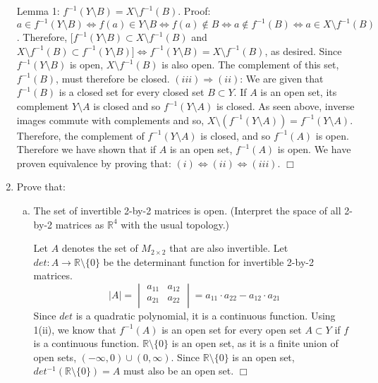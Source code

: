 \documentclass[12pt,letterpaper,reqno]{amsart}
\newcommand{\R}{\mathbb R}
\begin{document}
\begin{enumerate}[1.]
\begin{flushleft}
Lemma 1: $f^{-1}(Y \setminus B) = X \setminus f^{-1}(B)$. \newline Proof: $a \in f^{-1}(Y \setminus B) \Leftrightarrow f(a) \in Y \setminus B \Leftrightarrow f(a) \not\in B \Leftrightarrow a \not\in f^{-1}(B) \Leftrightarrow a \in X \setminus f^{-1}(B)$. Therefore, $[f^{-1}(Y \setminus B) \subset X \setminus f^{-1}(B)$ and $X \setminus f^{-1}(B) \subset f^{-1}(Y \setminus B)] \Leftrightarrow f^{-1}(Y \setminus B) = X \setminus f^{-1}(B)$, as desired. \newline
Since $f^{-1}(Y \setminus B)$ is open, $X \setminus f^{-1}(B)$ is also open. The complement of this set, $f^{-1}(B)$, must therefore be closed. \newline
$(iii) \Rightarrow (ii)$: We are given that $f^{-1}(B)$ is a closed set for every closed set $B\subset Y$. If $A$ is an open set, its complement $Y\setminus A$ is closed and so $f^{-1}(Y\setminus A)$ is closed. As seen above, inverse images commute with complements and so, $X \setminus (f^{-1}(Y\setminus A)) = f^{-1}(Y\setminus A)$. Therefore, the complement of $f^{-1}(Y\setminus A)$ is closed, and so $f^{-1}(A)$ is open. Therefore we have shown that if $A$ is an open set, $f^{-1}(A)$ is open.\newline
We have proven equivalence by proving that: $(i) \Leftrightarrow (ii) \Leftrightarrow (iii)$. $\Box$
\end{flushleft}
\item Prove that:
\begin{enumerate}[(a)]
\item The set of invertible 2-by-2 matrices is open. (Interpret the space of all 2-by-2 matrices as $\R^4$ with the usual topology.)
\begin{flushleft}
Let $A$ denotes the set of $M_{2\times2}$ that are also invertible.
Let $det: A \rightarrow \R\setminus\{0\}$ be the determinant function for invertible 2-by-2 matrices.
\[
|A| = 
\begin{vmatrix}
    a_{11} & a_{12} \\
    a_{21} & a_{22} \\
\end{vmatrix}
= a_{11}\cdot a_{22} - a_{12}\cdot a_{21}
\]
Since $det$ is a quadratic polynomial, it is a continuous function. Using 1(ii), we know that $f^{-1}(A)$ is an open set for every open set $A\subset Y$ if $f$ is a continuous function. $\R\setminus\{0\}$ is an open set, as it is a finite union of open sets, $(-\infty, 0) \cup (0, \infty)$. Since $\R\setminus\{0\}$ is an open set, $det^{-1}(\R\setminus\{0\}) = A$ must also be an open set. $\Box$

\end{flushleft}
\end{enumerate}
\end{enumerate}
\end{document}

